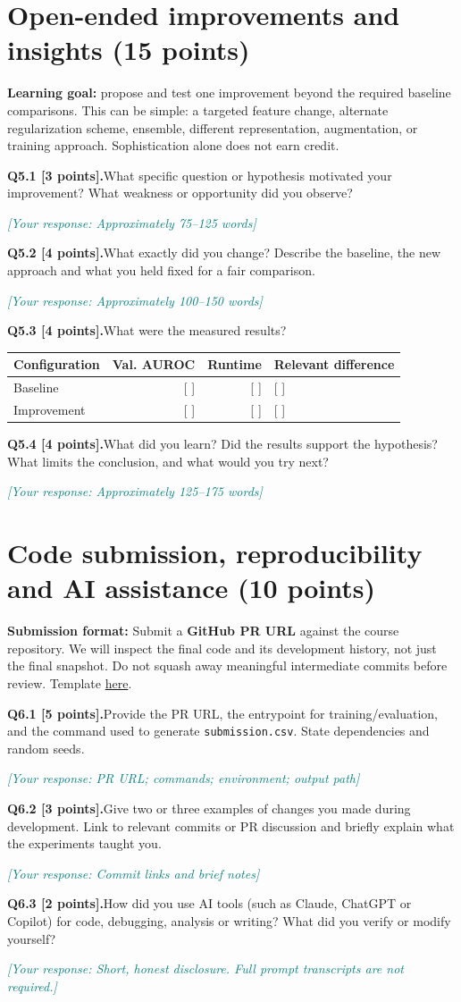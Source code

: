 \documentclass[11pt,letterpaper]{article}
\newcommand{\placeholder}[1]{\par\noindent\textcolor{teal}{\textit{[Your response: #1]}}\par\vspace{0.3em}}
\newcommand{\question}[2]{\needspace{4\baselineskip}\par\addvspace{0.45em}\noindent\textbf{#1}\quad #2\par\nobreak\vspace{0.1em}}
\begin{document}
\section{Open-ended improvements and insights (15 points)}
\textbf{Learning goal:} propose and test one improvement beyond the required baseline comparisons. This can be simple: a targeted feature change, alternate regularization scheme, ensemble, different representation, augmentation, or training approach. Sophistication alone does not earn credit.

\question{Q5.1 [3 points].}{What specific question or hypothesis motivated your improvement? What weakness or opportunity did you observe?}
\placeholder{Approximately 75--125 words}
\question{Q5.2 [4 points].}{What exactly did you change? Describe the baseline, the new approach and what you held fixed for a fair comparison.}
\placeholder{Approximately 100--150 words}
\question{Q5.3 [4 points].}{What were the measured results?}
\begin{tabularx}{\linewidth}{@{}YrrY@{}}\toprule Configuration & Val. AUROC & Runtime & Relevant difference \\ \midrule Baseline & [ ] & [ ] & [ ] \\ Improvement & [ ] & [ ] & [ ] \\ \bottomrule\end{tabularx}
\question{Q5.4 [4 points].}{What did you learn? Did the results support the hypothesis? What limits the conclusion, and what would you try next?}
\placeholder{Approximately 125--175 words}

\section{Code submission, reproducibility and AI assistance (10 points)}
\textbf{Submission format:} Submit a \textbf{GitHub PR URL} against the course repository. We will inspect the final code and its development history, not just the final snapshot. Do not squash away meaningful intermediate commits before review. Template \href{https://github.com/sekhari/human-or-ai-submissions}{here}.

\question{Q6.1 [5 points].}{Provide the PR URL, the entrypoint for training/evaluation, and the command used to generate \texttt{submission.csv}. State dependencies and random seeds.}
\placeholder{PR URL; commands; environment; output path}
\question{Q6.2 [3 points].}{Give two or three examples of changes you made during development. Link to relevant commits or PR discussion and briefly explain what the experiments taught you.}
\placeholder{Commit links and brief notes}
\question{Q6.3 [2 points].}{How did you use AI tools (such as Claude, ChatGPT or Copilot) for code, debugging, analysis or writing? What did you verify or modify yourself?}
\placeholder{Short, honest disclosure. Full prompt transcripts are not required.}
\end{document}
